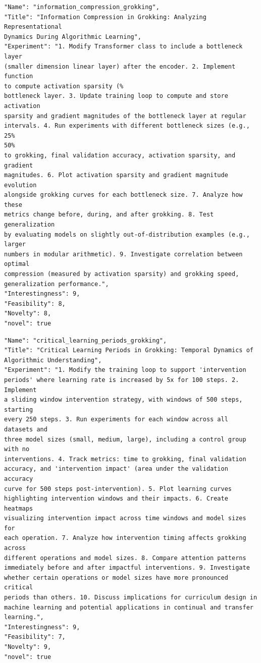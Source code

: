 \begin{tcolorbox}[breakable,colback=blue!5!white, colframe=blue!75!black, title=Idea 31/50 - \texttt{information\_compression\_grokking}]
\small
\begin{verbatim}
"Name": "information_compression_grokking",
"Title": "Information Compression in Grokking: Analyzing Representational
Dynamics During Algorithmic Learning",
"Experiment": "1. Modify Transformer class to include a bottleneck layer
(smaller dimension linear layer) after the encoder. 2. Implement function
to compute activation sparsity (%
bottleneck layer. 3. Update training loop to compute and store activation
sparsity and gradient magnitudes of the bottleneck layer at regular
intervals. 4. Run experiments with different bottleneck sizes (e.g., 25%
50%
to grokking, final validation accuracy, activation sparsity, and gradient
magnitudes. 6. Plot activation sparsity and gradient magnitude evolution
alongside grokking curves for each bottleneck size. 7. Analyze how these
metrics change before, during, and after grokking. 8. Test generalization
by evaluating models on slightly out-of-distribution examples (e.g., larger
numbers in modular arithmetic). 9. Investigate correlation between optimal
compression (measured by activation sparsity) and grokking speed,
generalization performance.",
"Interestingness": 9,
"Feasibility": 8,
"Novelty": 8,
"novel": true
\end{verbatim}
\end{tcolorbox}

\begin{tcolorbox}[breakable,colback=blue!5!white, colframe=blue!75!black, title=Idea 32/50 - \texttt{critical\_learning\_periods\_grokking}]
\small
\begin{verbatim}
"Name": "critical_learning_periods_grokking",
"Title": "Critical Learning Periods in Grokking: Temporal Dynamics of
Algorithmic Understanding",
"Experiment": "1. Modify the training loop to support 'intervention
periods' where learning rate is increased by 5x for 100 steps. 2. Implement
a sliding window intervention strategy, with windows of 500 steps, starting
every 250 steps. 3. Run experiments for each window across all datasets and
three model sizes (small, medium, large), including a control group with no
interventions. 4. Track metrics: time to grokking, final validation
accuracy, and 'intervention impact' (area under the validation accuracy
curve for 500 steps post-intervention). 5. Plot learning curves
highlighting intervention windows and their impacts. 6. Create heatmaps
visualizing intervention impact across time windows and model sizes for
each operation. 7. Analyze how intervention timing affects grokking across
different operations and model sizes. 8. Compare attention patterns
immediately before and after impactful interventions. 9. Investigate
whether certain operations or model sizes have more pronounced critical
periods than others. 10. Discuss implications for curriculum design in
machine learning and potential applications in continual and transfer
learning.",
"Interestingness": 9,
"Feasibility": 7,
"Novelty": 9,
"novel": true
\end{verbatim}
\end{tcolorbox}

